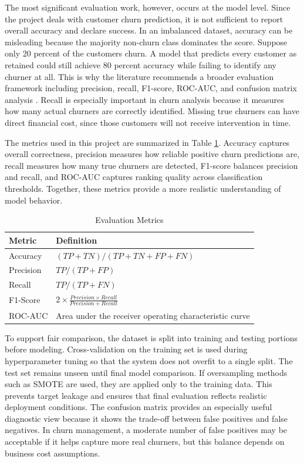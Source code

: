The most significant evaluation work, however, occurs at the model level. Since the project deals with customer churn prediction, it is not sufficient to report overall accuracy and declare success. In an imbalanced dataset, accuracy can be misleading because the majority non-churn class dominates the score. Suppose only 20 percent of the customers churn. A model that predicts every customer as retained could still achieve 80 percent accuracy while failing to identify any churner at all. This is why the literature recommends a broader evaluation framework including precision, recall, F1-score, ROC-AUC, and confusion matrix analysis \cite{systematicreview,imani2024,bhattacharjee2026}. Recall is especially important in churn analysis because it measures how many actual churners are correctly identified. Missing true churners can have direct financial cost, since those customers will not receive intervention in time.

The metrics used in this project are summarized in Table \ref{tab:evaluation_metrics_main}. Accuracy captures overall correctness, precision measures how reliable positive churn predictions are, recall measures how many true churners are detected, F1-score balances precision and recall, and ROC-AUC captures ranking quality across classification thresholds. Together, these metrics provide a more realistic understanding of model behavior.

\begin{table}[H]
\centering
\caption{Evaluation Metrics}
\begin{tabular}{|p{3cm}|p{8.5cm}|}
\hline
\textbf{Metric} & \textbf{Definition} \\ \hline
Accuracy & $(TP + TN) / (TP + TN + FP + FN)$ \\ \hline
Precision & $TP / (TP + FP)$ \\ \hline
Recall & $TP / (TP + FN)$ \\ \hline
F1-Score & $2 \times \frac{Precision \times Recall}{Precision + Recall}$ \\ \hline
ROC-AUC & Area under the receiver operating characteristic curve \\ \hline
\end{tabular}
\label{tab:evaluation_metrics_main}
\end{table}

To support fair comparison, the dataset is split into training and testing portions before modeling. Cross-validation on the training set is used during hyperparameter tuning so that the system does not overfit to a single split. The test set remains unseen until final model comparison. If oversampling methods such as SMOTE are used, they are applied only to the training data. This prevents target leakage and ensures that final evaluation reflects realistic deployment conditions. The confusion matrix provides an especially useful diagnostic view because it shows the trade-off between false positives and false negatives. In churn management, a moderate number of false positives may be acceptable if it helps capture more real churners, but this balance depends on business cost assumptions.

